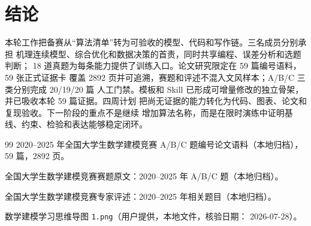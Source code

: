 \section{结论}

本轮工作把备赛从“算法清单”转为可验收的模型、代码和写作链。三名成员分别承担
机理连续模型、综合优化和数据决策的首责，同时共享编程、误差分析和选题判断；
18 道真题为每条能力提供了训练入口。论文研究限定在 59 篇编号语料，59 张正式证据卡
覆盖 2892 页并可追溯，赛题和评述不混入文风样本；A/B/C 三类分别完成 20/19/20 篇
人工门禁。模板和 Skill 已形成可增量修改的独立骨架，并已吸收本轮 59 篇证据。四周计划
把尚无证据的能力转化为代码、图表、论文和复现验收。下一阶段的重点不是继续
增加算法名称，而是在限时演练中证明基线、约束、检验和表达能够稳定闭环。

\begin{thebibliography}{99}
2020--2025 年全国大学生数学建模竞赛 A/B/C 题编号论文语料（本地归档），
59 篇，2892 页。

全国大学生数学建模竞赛赛题原文：2020--2025 年 A/B/C 题（本地归档）。

全国大学生数学建模竞赛专家评述：2020--2025 年相关题目（本地归档）。

数学建模学习思维导图 \texttt{1.png}（用户提供，本地文件，核验日期：
2026-07-28）。
\end{thebibliography}

\appendix
